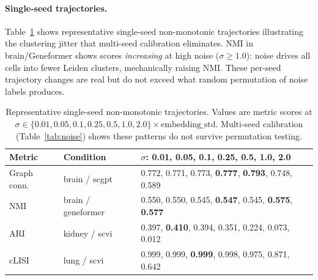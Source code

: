 \documentclass[11pt]{article}
\begin{document}
\paragraph{Single-seed trajectories.}
Table~\ref{tab:app_noise_fail} shows representative single-seed
non-monotonic trajectories illustrating the clustering jitter that
multi-seed calibration eliminates. NMI in brain/Geneformer shows scores
\emph{increasing} at high noise ($\sigma \geq 1.0$): noise drives all
cells into fewer Leiden clusters, mechanically raising NMI. These
per-seed trajectory changes are real but do not exceed what random
permutation of noise labels produces.

\medskip
\begin{table}[h!]
\centering
\caption{Representative single-seed non-monotonic trajectories. Values
are metric scores at $\sigma \in \{0.01, 0.05, 0.1, 0.25, 0.5, 1.0,
2.0\} \times \text{embedding\_std}$. Multi-seed calibration
(Table~\ref{tab:noise}) shows these patterns do not survive permutation
testing.}
\label{tab:app_noise_fail}
\footnotesize
\begin{tabular}{@{}llp{}@{}}
\toprule
Metric & Condition & $\sigma$: 0.01, 0.05, 0.1, 0.25, 0.5, 1.0, 2.0 \\
\midrule
Graph conn. & brain / scgpt & 0.772, 0.771, 0.773, \textbf{0.777}, \textbf{0.793}, 0.748, 0.589 \\
NMI & brain / geneformer & 0.550, 0.550, 0.545, \textbf{0.547}, 0.545, \textbf{0.575}, \textbf{0.577} \\
ARI & kidney / scvi & 0.397, \textbf{0.410}, 0.394, 0.351, 0.224, 0.073, 0.012 \\
cLISI & lung / scvi & 0.999, 0.999, \textbf{0.999}, 0.998, 0.975, 0.871, 0.642 \\
\bottomrule
\end{tabular}
\end{table}




\end{document}
